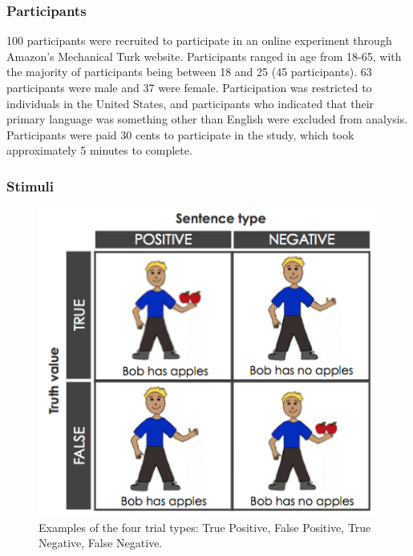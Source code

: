\documentclass[man]{apa2}
\begin{document}
\subsubsection{Participants}

100 participants were recruited to participate in an online experiment through Amazon's Mechanical Turk website.  Participants ranged in age from 18-65, with the majority of participants being between 18 and 25 (45 participants).  63 participants were male and 37 were female.  Participation was restricted to individuals in the United States, and participants who indicated that their primary language was something other than English were excluded from analysis.  Participants were paid 30 cents to participate in the study, which took approximately 5 minutes to complete.  

\subsubsection{Stimuli}

\begin{figure}
\begin{center} 
\includegraphics[height=4in]{figures/stimuli.png}
\caption{\label{fig:addition_subs} Examples of the four trial types: True Positive, False Positive, True Negative, False Negative.}
\end{center} 
\end{figure}
\end{document}
